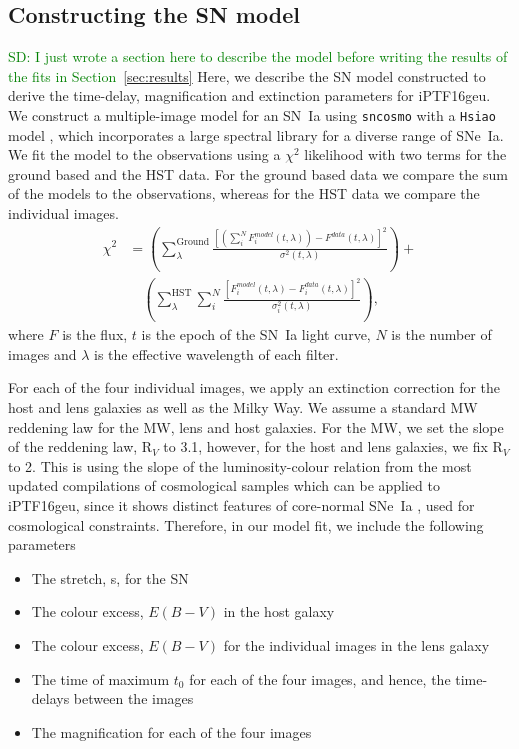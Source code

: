 \documentclass[a4paper,fleqn,usenatbib]{mnras}
\newcommand{\sd}[1]{\textcolor{green}{SD: #1}}
\begin{document}
\subsection{Constructing the SN model}
\sd{I just wrote a section here to describe the model before writing the results of the fits in Section~\ref{sec:results}}
Here, we describe the SN model constructed to derive the time-delay, magnification and extinction parameters for iPTF16geu. We construct a multiple-image model for an SN~Ia using \texttt{sncosmo} with a \texttt{Hsiao} model \citep{2007ApJ...663.1187H}, which incorporates a large spectral library for a diverse range of SNe~Ia. 
  We fit the model to the observations using a $\chi^2$ likelihood with two terms for the ground based and the HST data. For the ground based data we compare the sum of the models to the observations, whereas for the HST data we compare the individual images. 
\begin{equation}
\label{eq:chi}
\begin{aligned}
\chi ^2 &= \left(\sum_{\lambda}^{\mathrm{Ground}}\frac{\left[\left(\sum_i^{N} F_i^{model}(t,\lambda)\right)-F^{data}(t,\lambda)\right]^2}{\sigma^2(t,\lambda)}\right)+ \\
&\quad \left(\sum_{\lambda}^{\mathrm{HST}}\sum_i^{N}\frac{\left[F_i^{model}(t,\lambda)-F_i^{data}(t,\lambda)\right]^2}{\sigma_i^2(t,\lambda)}\right),
\end{aligned}
\end{equation}
where $F$ is the flux, $t$ is the epoch of the SN~Ia light curve, $N$ is the number of images and $\lambda$ is the effective wavelength of each filter. 

For each of the four individual images, we apply an extinction correction for the host and lens galaxies as well as the Milky Way. We assume a standard MW reddening law \citep{1989ApJ...345..245C} for the MW, lens and host galaxies. For the MW, we set the slope of the reddening law, R$_V$ to 3.1, however, for the host and lens galaxies, we fix  R$_V$ to 2. This is using the slope of the luminosity-colour relation from the most updated compilations of cosmological samples \citep[see;][]{2018ApJ...859..101S,2018arXiv181102374D} which can be applied to iPTF16geu, since it shows distinct features of core-normal SNe~Ia \citep[e.g.,][]{2006PASP..118..560B}, used for cosmological constraints. Therefore, in our model fit, we include the following parameters 
\begin{itemize}
    \item The stretch, s, for the SN
    \item The colour excess, $E(B-V)$ in the host galaxy
    \item The colour excess, $E(B-V)$ for the individual images in the lens galaxy 
    \item The time of maximum $t_{0}$ for each of the four images, and hence, the time-delays between the images
    \item The magnification for each of the four images
\end{itemize}
\end{document}
